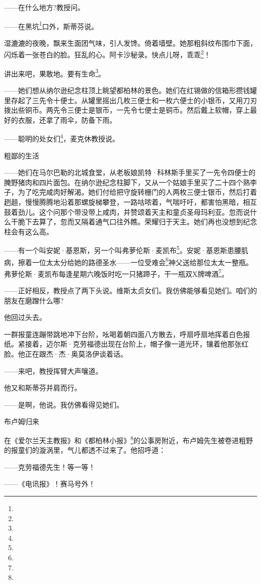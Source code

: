 \par ——在什么地方?教授问。
\par ——在黑坑\footnote{}口外，斯蒂芬说。
\par 湿漉漉的夜晚，飘来生面团气味，引人发馋。倚着墙壁。她那粗斜纹布围巾下面，闪烁着一张苍白的脸。狂乱的心。阿卡沙秘录。快点儿呀，乖乖\footnote{}！
\par 讲出来吧，果敢地。要有生命\footnote{}。
\par ——她们想从纳尔逊纪念柱顶上眺望都柏林的景色。她们在红锡做的信箱形攒钱罐里存起了三先令十便士。从罐里摇出几枚三便士和一枚六便士的小银币，又用刀刃拨出些铜币。两先令三便士是银币，一先令七便士是铜币。然后戴上软帽，穿上最好的衣服，还拿了雨伞，防备下雨。
\par ——聪明的处女们\footnote{}，麦克休教授说。
\par 粗鄙的生活
\par ——她们在马尔巴勒的北城食堂，从老板娘凯特·科林斯手里买了一先令四便士的腌野猪肉和四片面包。在纳尔逊纪念柱脚下，又从一个姑娘手里买了二十四个熟李子，为了吃完咸肉好解渴。她们付给把守旋转栅门的人两枚三便士银币，然后打着趔趄，慢慢腾腾地沿着那螺旋梯攀登，一路咕哝着，气喘吁吁，都害怕黑暗，相互鼓着劲儿。这个问那个带没带上咸肉，并赞颂着天主和童贞圣母玛利亚。忽而说什么干脆下去算了，忽而又隔着通气口往外瞧。荣耀归于天主。她们再也没想到纪念柱会有这么高。
\par ——有一个叫安妮·基恩斯，另一个叫弗萝伦斯·麦凯布\footnote{}。安妮·基恩斯患腰肌病，擦着一位太太分给她的路德圣水——一位受难会\footnote{}神父送给那位太太一整瓶。弗萝伦斯·麦凯布每逢星期六晚饭时吃一只猪蹄子，干一瓶双X牌啤酒\footnote{}。
\par ——正好相反，教授点了两下头说。维斯太贞女们。我仿佛能够看见她们。咱们的朋友在磨蹭什么哪?
\par 他回过头去。
\par 一群报童连蹦带跳地冲下台阶，吆喝着朝四面八方散去，呼扇呼扇地挥着白色报纸。紧接着，迈尔斯·克劳福德出现在台阶上，帽子像一道光环，镶着他那张红脸。他正在跟杰·杰·奥莫洛伊谈着话。
\par ——来吧，教授挥臂大声嚷道。
\par 他又和斯蒂芬并肩而行。
\par ——是啊，他说。我仿佛看得见她们。
\par 布卢姆归来
\par 在《爱尔兰天主教报》和《都柏林小报》\footnote{}的公事房附近，布卢姆先生被卷进粗野的报童们的漩涡里，气儿都透不过来了。他招呼道：
\par ——克劳福德先生！等一等！
\par ——《电讯报》！赛马号外！
